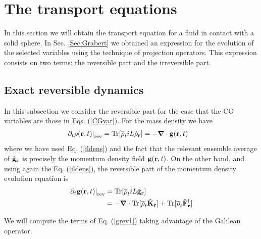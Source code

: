 \documentclass[b5paper,openright,11pt]{book}
\begin{document}
\section{The transport equations}
\label{Sec:TransEqs}
In this section we will obtain the transport equation for a fluid in contact with a solid sphere. In Sec. \ref{Sec:Grabert} we obtained an expression for the evolution of the selected variables using the technique of projection operators. This expression consists on two terms: the reversible part and the irreversible part. 
\subsection{Exact reversible dynamics}\label{Sec:ExactCont}
In this subsection we consider the reversible part for the case that the CG variables are those in Eqs. (\ref{CGvar}).
For the mass density we have
\begin{align}
\left.\partial_t \rho({\bf r},t)\right|_{\rm rev}
&=  {\rm Tr}[\overline{\rho}_t  iL\hat{\rho}_{\bf r}] 
=-\boldsymbol{\nabla}\cdot {\bf  g}({\bf r},t)
\label{conrho}
\end{align}
where we have used Eq. (\ref{ildens}) and the fact that the relevant
ensemble average of $\hat{\bf g}_{\bf  r}$ is precisely  the momentum
density field ${\bf g}({\bf r},t)$.  On the other hand, and using again the Eq. (\ref{ildens}), the reversible
part of the momentum density evolution equation is
\begin{align}
\left.\partial_t {\bf g}({\bf r},t)\right|_{\rm rev}
&=  {\rm Tr}[\overline{\rho}_t  iL\hat{{\bf g}}_{\bf r}] 
\nonumber\\
&=-\boldsymbol{\nabla}\cdot  {\rm Tr}[\overline{\rho}_t \hat{{\bf K}}_{\bf r}] 
+  {\rm Tr}[\overline{\rho}_t  \hat{\bf F}^{\rm l}_{\bf r}]
\label{grev1}
\end{align}

We will compute the terms of Eq. (\ref{grev1}) taking advantage of the Galilean operator. 
\end{document}

